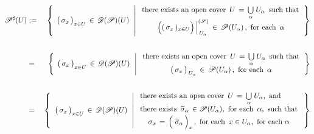 \vskip 0.5cm
\begin{remark}
\mbox{}\vskip 0.1cm
\noindent
\begin{eqnarray*}
\mathscr{P}^{\sharp}(U)
& := &
	\left\{\;\,
		\left(\,\overset{{\color{white}.}}{\sigma_{x}}\,\right)_{x \in U} \,\in\, \mathscr{D}(\mathscr{P})(U)
		\,\;\left\vert\;
			\begin{array}{c}
			\textnormal{there exists an open cover \,$U \,=\, \underset{\alpha}{\bigcup}\;U_{\alpha}$\, such that}
			\\
			\textnormal{$\left.\left(\overset{{\color{white}.}}{(\,\sigma_{x}\,)_{x \in U}}\right)\,\right\vert^{(\mathscr{S})}_{\,U_{\alpha}} \,\in\, \mathscr{P}(U_{\alpha})$\,,\, for each \,$\alpha$}
			\end{array}
			\right.
		\right\}
\\ & {\color{white}\textnormal{\large$1$}} &
\\
& = &
	\left\{\;\,
		\left(\,\overset{{\color{white}.}}{\sigma_{x}}\,\right)_{x \in U} \,\in\, \mathscr{D}(\mathscr{P})(U)
		\,\;\left\vert\;
			\begin{array}{c}
			\textnormal{there exists an open cover \,$U \,=\, \underset{\alpha}{\bigcup}\;U_{\alpha}$\, such that}
			\\
			\textnormal{$\left(\,\overset{{\color{white}.}}{\sigma_{x}}\,\right)_{\,U_{\alpha}} \,\in\, \mathscr{P}(U_{\alpha})$\,,\, for each \,$\alpha$}
			\end{array}
			\right.
		\right\}
\\ & {\color{white}\textnormal{\large$1$}} &
\\
& = &
	\left\{\;\;
		\left(\,\overset{{\color{white}.}}{\sigma_{x}}\,\right)_{x \in U} \,\in\, \mathscr{D}(\mathscr{P})(U)
		\;\,\left\vert\;
			\begin{array}{c}
			\textnormal{there exists an open cover \,$U \,=\, \underset{\alpha}{\bigcup}\;U_{\alpha}$,\, and{\color{white}2222.}}
			\\
			\textnormal{there exists \,$\widetilde{\sigma}_{\alpha} \,\in \mathscr{P}(U_{\alpha})$,\, for each \,$\alpha$,\, such that}
			\\
			\textnormal{$\overset{{\color{white}\textnormal{\normalsize$1$}}}{\sigma_{x}} \,=\, \left(\;\overset{{\color{white}.}}{\widetilde{\sigma}_{\alpha}}\,\right)_{x}$\,,\, for each \,$x \in U_{\alpha}$,\, for each $\alpha$}
			\end{array}
			\right.
		\,\right\}
\end{eqnarray*}
\end{remark}

